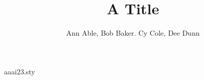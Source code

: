 \begin{filecontents*}[overwrite]{aaai23.sty}
\def\maketitle{\par\begingroup\def\thefootnote{\fnsymbol{footnote}}\twocolumn[\@maketitle]\@thanks\endgroup
  \setcounter{footnote}{0}\let\maketitle\relax\let\@maketitle\relax
  \gdef\@thanks{}\gdef\@author{}\gdef\@title{}\let\thanks\relax}
\def\@maketitle{\newcounter{eqfn}\setcounter{eqfn}{0}%
  \vbox{\let\footnote\thanks\relax\setcounter{footnote}{0}%
    \def\equalcontrib{\ifnum\value{eqfn}=0 \footnote{These authors contributed equally.}%
      \setcounter{eqfn}{\value{footnote}}\else\footnotemark[\value{eqfn}]\fi}%
    \hsize\textwidth\centering{\LARGE\bf\@title\par}\vskip 1em{\Large\bf\@author\par}}}
\end{filecontents*}
\documentclass{article}
\usepackage{aaai23}
\title{A Title}
\author{Ann Able\equalcontrib, Bob Baker\equalcontrib. Cy Cole, Dee Dunn}

\maketitle
Body.


